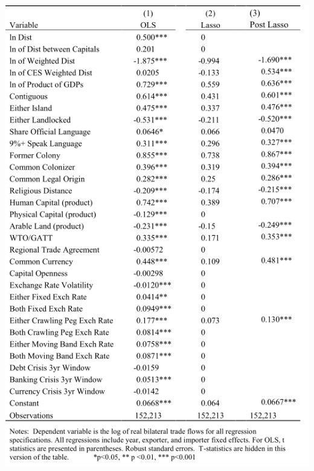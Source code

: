 \begin{frame}
    \vspace{-10pt}
    \begin{center}
    \includegraphics[height=\textheight]{./resources/BaxterOLS}
    \end{center}
\end{frame}

